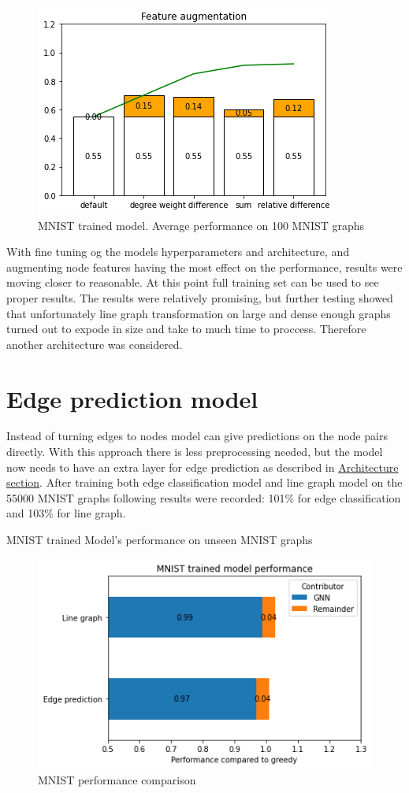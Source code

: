 \begin{figure}[H]
    \centering
    \includegraphics[scale=1.0]{figures/FeatureAugmentationLine}
    \caption{MNIST trained model. Average performance on 100 MNIST graphs}
    \label{Feature Augmentation Effect}
\end{figure}

With fine tuning og the models hyperparameters and architecture, and augmenting node features having the most effect on the performance, results were moving closer to reasonable. At this point full training set can be used to see proper results. The results were relatively promising, but further testing showed that unfortunately line graph transformation on large and dense enough graphs turned out to expode in size and take to much time to proccess. Therefore another architecture was considered.
 
\section{Edge prediction model}

Instead of turning edges to nodes model can give predictions on the node pairs directly. With this approach there is less preprocessing needed, but the model now needs to have an extra layer for edge prediction as described in \hyperref[sec:architecture]{Architecture section}.
After training both edge classification model and line graph model on the 55000 MNIST graphs following results were recorded: 101\% for edge classification and 103\% for line graph.

MNIST trained Model's performance on unseen MNIST graphs
\begin{figure}[H]
    \centering
    \includegraphics[scale=1.0]{figures/FinalPerformanceMNIST}
    \caption{MNIST performance comparison}
    \label{Model performance on MNIST}
\end{figure}

